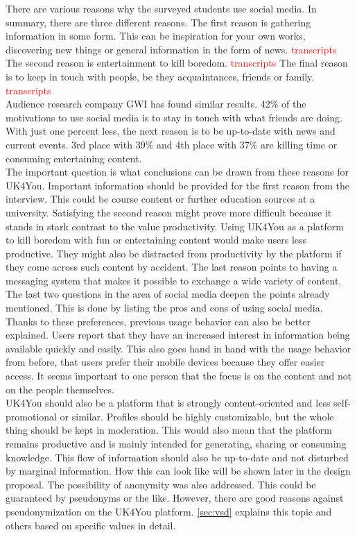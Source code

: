 There are various reasons why the surveyed students use social media.
In summary, there are three different reasons.
The first reason is gathering information in some form.
This can be inspiration for your own works, discovering new things or general information in the form of news. \textcolor{red}{transcripts}
The second reason is entertainment to kill boredom. \textcolor{red}{transcripts}
The final reason is to keep in touch with people, be they acquaintances, friends or family. \textcolor{red}{transcripts} \\

Audience research company GWI has found similar results\cite{gwi-top-10-reasons}.
42\% of the motivations to use social media is to stay in touch with what friends are doing.
With just one percent less, the next reason is to be up-to-date with news and current events.
3rd place with 39\% and 4th place with 37\% are killing time or consuming entertaining content.\\

The important question is what conclusions can be drawn from these reasons for UK4You.
Important information should be provided for the first reason from the interview.
This could be course content or further education sources at a university.
Satisfying the second reason might prove more difficult because it stands in stark contrast to the value productivity.
Using UK4You as a platform to kill boredom with fun or entertaining content would make users less productive.
They might also be distracted from productivity by the platform if they come across such content by accident.
The last reason points to having a messaging system that makes it possible to exchange a wide variety of content.\\

The last two questions in the area of social media deepen the points already mentioned.
This is done by listing the pros and cons of using social media.
Thanks to these preferences, previous usage behavior can also be better explained.
Users report that they have an increased interest in information being available quickly and easily.
This also goes hand in hand with the usage behavior from before, that users prefer their mobile devices because they offer easier access.
It seems important to one person that the focus is on the content and not on the people themselves.\\

UK4You should also be a platform that is strongly content-oriented and less self-promotional or similar.
Profiles should be highly customizable, but the whole thing should be kept in moderation.
This would also mean that the platform remains productive and is mainly intended for generating, sharing or consuming knowledge.
This flow of information should also be up-to-date and not disturbed by marginal information.
How this can look like will be shown later in the design proposal.
The possibility of anonymity was also addressed.
This could be guaranteed by pseudonyms or the like.
However, there are good reasons against pseudonymization on the UK4You platform.
\autoref{sec:vsd} explains this topic and others based on specific values in detail.


